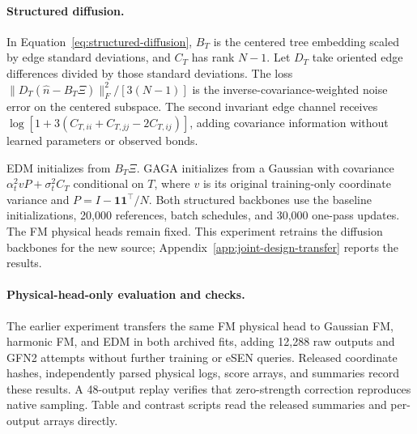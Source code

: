 \paragraph{Structured diffusion.}
In Equation~\ref{eq:structured-diffusion}, $B_T$ is the centered tree embedding scaled by edge standard deviations, and $C_T$ has rank $N-1$. Let $D_T$ take oriented edge differences divided by those standard deviations. The loss $\|D_T(\widehat n-B_T\Xi)\|_F^2/[3(N-1)]$ is the inverse-covariance-weighted noise error on the centered subspace. The second invariant edge channel receives $\log[1+3(C_{T,ii}+C_{T,jj}-2C_{T,ij})]$, adding covariance information without learned parameters or observed bonds.

EDM initializes from $B_T\Xi$. GAGA initializes from a Gaussian with covariance $\alpha_t^2vP+\sigma_t^2C_T$ conditional on $T$, where $v$ is its original training-only coordinate variance and $P=I-\boldsymbol1\boldsymbol1^\top/N$. Both structured backbones use the baseline initializations, 20,000 references, batch schedules, and 30,000 one-pass updates. The FM physical heads remain fixed. This experiment retrains the diffusion backbones for the new source; Appendix~\ref{app:joint-design-transfer} reports the results.

\paragraph{Physical-head-only evaluation and checks.}
The earlier experiment transfers the same FM physical head to Gaussian FM, harmonic FM, and EDM in both archived fits, adding 12,288 raw outputs and GFN2 attempts without further training or eSEN queries. Released coordinate hashes, independently parsed physical logs, score arrays, and summaries record these results. A 48-output replay verifies that zero-strength correction reproduces native sampling. Table and contrast scripts read the released summaries and per-output arrays directly.
